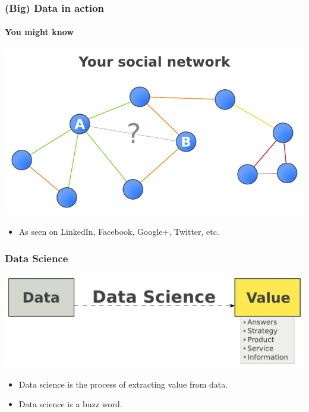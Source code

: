 \begin{frame}
\frametitle{(Big) Data in action}
\framesubtitle{You might know}
\begin{center}


\includegraphics[width=1\textwidth]{graphics/Social-network.pdf}

\bigskip

\begin{itemize}
	\item As seen on LinkedIn, Facebook, Google+, Twitter, etc.
\end{itemize}

\end{center}
\end{frame}


\begin{frame}
\frametitle{Data Science}

\begin{center}

\includegraphics[width=1\textwidth]{graphics/value.pdf}

\bigskip

\begin{itemize}
	\item<1-> Data science is the process of extracting value from data.
	\item<2-> Data science is a buzz word.
\end{itemize}

\end{center}

\end{frame}

